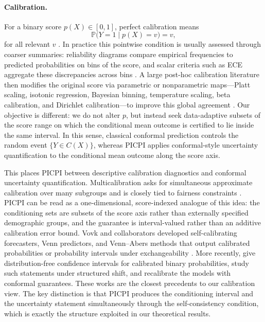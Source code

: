 \documentclass[11pt]{article}
\theoremstyle{statplain}
\theoremstyle{statdefinition}
\newcommand{\0}{\mathbf{0}}
\newcommand{\titleShort}{PICPI\xspace}
\begin{document}
\paragraph{Calibration.}
For a binary score $p(X)\in[0,1]$, perfect calibration means
\[
\mathbb{P}\Big(Y=1\mid p(X)=v\Big)=v,
\]
for all relevant $v$ \citep{dawid1982wellcalibrated,foster1998asymptotic}. In practice this pointwise condition is usually assessed through coarser summaries: reliability diagrams compare empirical frequencies to predicted probabilities on bins of the score, and scalar criteria such as ECE aggregate these discrepancies across bins \citep{gneiting2007strictly,vaicenavicius2019evaluating,carrell2022calibration,blasiok2024smooth}. A large post-hoc calibration literature then modifies the original score via parametric or nonparametric maps---Platt scaling, isotonic regression, Bayesian binning, temperature scaling, beta calibration, and Dirichlet calibration---to improve this global agreement \citep{platt1999probabilistic,zadrozny2002transforming,niculescu2005predicting,naeini2015obtaining,guo2017calibration,kull2017beta,kull2019beyond}. Our objective is different: we do not alter $p$, but instead seek data-adaptive subsets of the score range on which the conditional mean outcome is certified to lie inside the same interval. In this sense, classical conformal prediction controls the random event $\{Y\in C(X)\}$, whereas \titleShort applies conformal-style uncertainty quantification to the conditional mean outcome along the score axis.

This places \titleShort between descriptive calibration diagnostics and conformal uncertainty quantification. Multicalibration asks for simultaneous approximate calibration over many subgroups and is closely tied to fairness constraints \citep{hebert2018multicalibration,kleinberg2016inherent,pleiss2017fairness}. \titleShort can be read as a one-dimensional, score-indexed analogue of this idea: the conditioning sets are subsets of the score axis rather than externally specified demographic groups, and the guarantee is interval-valued rather than an additive calibration error bound. Vovk and collaborators developed self-calibrating forecasters, Venn predictors, and Venn--Abers methods that output calibrated probabilities or probability intervals under exchangeability \citep{vovk2003self,vovk2014vennabers}. More recently, \citet{gupta2020distribution} give distribution-free confidence intervals for calibrated binary probabilities, \citet{podkopaev2021distribution} study such statements under structured shift, and \citet{van2024self} recalibrate the models with conformal guarantees. These works are the closest precedents to our calibration view. The key distinction is that \titleShort produces the conditioning interval and the uncertainty statement simultaneously through the self-consistency condition, which is exactly the structure exploited in our theoretical results.
\end{document}
